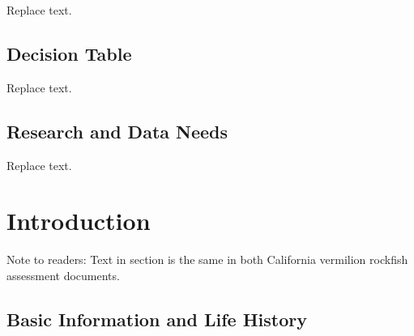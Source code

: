 \documentclass[11pt,
  english,
  a4paper,
]{article}
\begin{document}
\leavevmode\tagmcend\tagstructend

Replace text.


\hypertarget{decision-table}{%
\subsection*{Decision Table}\label{decision-table}}

\leavevmode\tagmcend\tagstructend

Replace text.


\hypertarget{research-and-data-needs}{%
\subsection*{Research and Data Needs}\label{research-and-data-needs}}

\leavevmode\tagmcend\tagstructend

Replace text.

\pagebreak
\setlength{\parskip}{5mm plus1mm minus1mm}
\setcounter{page}{1}
\renewcommand{\thefigure}{\arabic{figure}}
\renewcommand{\thetable}{\arabic{table}}
\setcounter{table}{0}
\setcounter{figure}{0}


\hypertarget{introduction}{%
\section{Introduction}\label{introduction}}

\leavevmode\tagmcend\tagstructend

Note to readers: Text in section is the same in both California vermilion rockfish assessment documents.


\hypertarget{basic-information-and-life-history}{%
\subsection{Basic Information and Life History}\label{basic-information-and-life-history}}

\leavevmode\tagmcend\tagstructend
\end{document}
